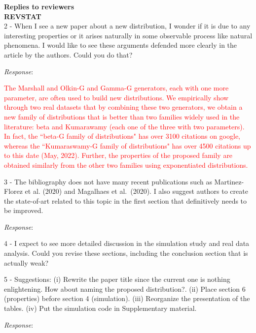 \documentclass[version=last,12pt,{"maintainersDelight"}]{scrlttr2}
\begin{document}
\begin{letter}{\textbf{Replies to reviewers}\\\textbf{REVSTAT}\\}
2 - When I see a new paper about a new distribution, I wonder if it is due to any interesting properties or it arises naturally in some
observable process like natural phenomena. I would like to see these
arguments defended more clearly in the article by the authors. Could you do that?



\emph{Response}:

\textcolor{red}{The Marshall and Olkin-G and Gamma-G generators, each with one more parameter, are often used to build new distributions. We empirically show through two real datasets that by combining these two generators, we obtain a new family of distributions that is better than two families widely used in the literature: beta and Kumarawamy (each one of the three with two parameters). In fact, the ``beta-G family of distributions" has over 3100 citations on google, whereas the ``Kumaraswamy-G family of distributions" has over 4500 citations  up to this date (May, 2022). Further, the properties of the proposed family are obtained similarly from the other two families using exponentiated distributions.} 

3 - The bibliography does not have many recent publications such as
Martinez-Florez et al. (2020) and Magalhaes et al.~(2020). I also
suggest authors to create the state-of-art related to this topic in the first section that definitively needs to be improved.

\emph{Response}:

4 - I expect to see more detailed discussion in the simulation study and real data analysis. Could you revise these sections, including the conclusion section that is actually weak?

5 - Suggestions: (i) Rewrite the paper title since the current one is nothing enlightening. How about naming the proposed distribution?. (ii) Place section 6 (properties) before section 4 (simulation). (iii) Reorganize the presentation of the tables. (iv) Put the simulation code in Supplementary material.

\emph{Response}:


\end{letter}
\end{document}

